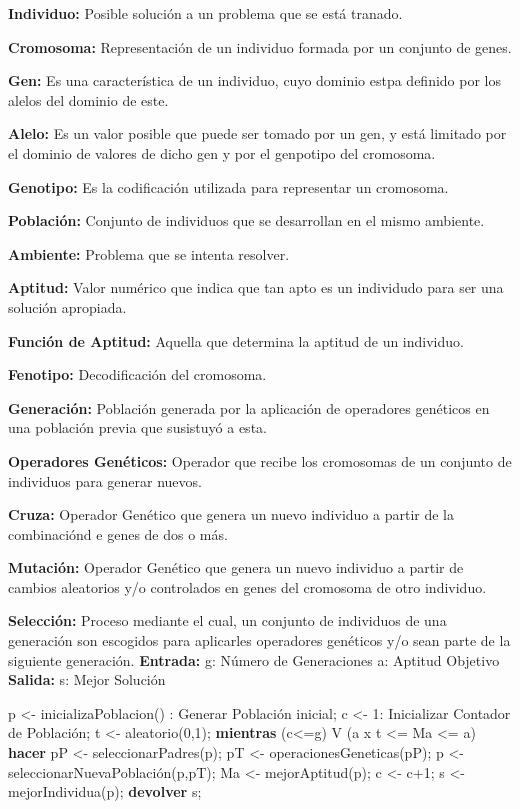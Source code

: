 		\textbf{Individuo:} Posible solución a un problema que se está tranado.

		\textbf{Cromosoma:} Representación de un individuo formada por un conjunto de genes.

		\textbf{Gen:} Es una característica de un individuo, cuyo dominio estpa definido por los alelos del dominio de este.

		\textbf{Alelo:} Es un valor posible que puede ser tomado por un gen, y está limitado por el dominio de valores de dicho gen y por el genpotipo del cromosoma.

		\textbf{Genotipo:} Es la codificación utilizada para representar un cromosoma.

		\textbf{Población:} Conjunto de individuos que se desarrollan en el mismo ambiente.

		\textbf{Ambiente:} Problema que se intenta resolver.

		\textbf{Aptitud:} Valor numérico que indica que tan apto es un individudo para ser una solución apropiada.

		\textbf{Función de Aptitud:} Aquella que determina la aptitud de un individuo.

		\textbf{Fenotipo:} Decodificación del cromosoma.

		\textbf{Generación:} Población generada por la aplicación de operadores genéticos en una población previa que susistuyó a esta.

		\textbf{Operadores Genéticos:} Operador que recibe los cromosomas de un conjunto de individuos para generar nuevos.

		\textbf{Cruza:} Operador Genético que genera un nuevo individuo a partir de la combinaciónd e genes de dos o más.

		\textbf{Mutación:} Operador Genético que genera un nuevo individuo a partir de cambios aleatorios y/o controlados en genes del cromosoma de otro individuo.

		\textbf{Selección:} Proceso mediante el cual, un conjunto de individuos de una generación son escogidos para aplicarles operadores genéticos y/o sean parte de la siguiente generación. 
		\textbf{Entrada:}
		g: Número de Generaciones
		a: Aptitud Objetivo
		\textbf{Salida:}
		s: Mejor Solución

		p <- inicializaPoblacion() : Generar Población inicial;
		c <- 1: Inicializar Contador de Población;
		t <- aleatorio(0,1);
		\textbf{mientras} (c<=g) V (a x t <= Ma <= a) \textbf{hacer}
			pP <- seleccionarPadres(p);
			pT <- operacionesGeneticas(pP);
			p <- seleccionarNuevaPoblación(p,pT);
			Ma <- mejorAptitud(p);
			c <- c+1;
		s <- mejorIndividua(p);
		\textbf{devolver} s;	


